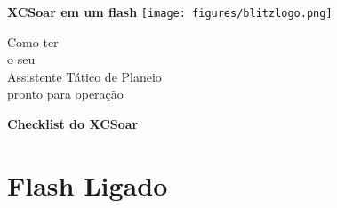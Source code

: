 \documentclass[a4paper,12pt]{refrep}
\begin{document}
%
%
%
\thispagestyle{empty}
\begin{center}
\fontsize{34}{0}
\selectfont\textbf{XCSoar em um flash}
\fontsize{12}{12}
\vspace{0.1em}
\texttt{[image: figures/blitzlogo.png]}

\vspace{1em}
{\Huge Como ter\\}
\vspace{0.2em}
{\tiny o seu\\}
{Assistente Tático de Planeio\\}
\vspace{0.2em}
{\tiny pronto para operação }
\end{center}

\newpage
\begin{center}
{\Huge\textbf{Checklist do XCSoar }}
\end{center}
\section*{Flash \textcolor{flashyellow}{Ligado}}\label{ch:flashon}
\end{document}
